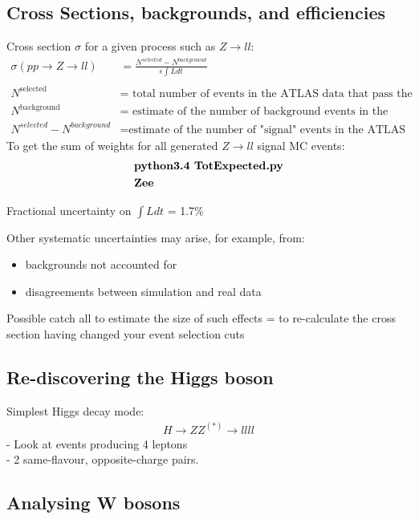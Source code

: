 \documentclass[11pt]{article}
\newcommand{\<}{\guilsinglleft}
\renewcommand{\>}{\guilsinglright}
\begin{document}
    \subsection{Cross Sections, backgrounds, and efficiencies}
    Cross section $\sigma$ for a given process such as $Z \rightarrow ll$:
    \begin{align}
        \sigma (pp \rightarrow Z \rightarrow ll) &= \frac{N^{selected} -  N^{background}}{\epsilon \int L dt}
        \\\\
        N^{\text{selected}} &= \text{ total number of events in the ATLAS data that pass the final selection cuts}
        \\
        N^{\text{background}} &= \text{ estimate of the number of background events in the selected data sample}
        \\
        N^{selected} -  N^{background} &= \text{estimate of the number of "signal" events in the ATLAS data for the targeted physics process}
    \end{align}
    To get the sum of weights for all generated $Z \rightarrow ll$ signal MC events:
    \begin{align}
        & \text{\textbf{python3.4 TotExpected.py}}
        \\
        & \text{\textbf{Zee}}
    \end{align}

    Fractional uncertainty on $\int L dt$ = 1.7\%

    Other systematic uncertainties may arise, for example, from:
    \begin{itemize}
        \item backgrounds not accounted for
        \item disagreements between simulation and real data
    \end{itemize}
    Possible catch all to estimate the size of such effects = to re-calculate the cross section having changed your event selection cuts

    \subsection{Re-discovering the Higgs boson}
    Simplest Higgs decay mode:
    \begin{align}
        H \rightarrow ZZ^{(*)} \rightarrow llll
    \end{align}
     - Look at events producing 4 leptons\\
     - 2 same-flavour, opposite-charge pairs.


    \subsection{Analysing W bosons}
\end{document}
